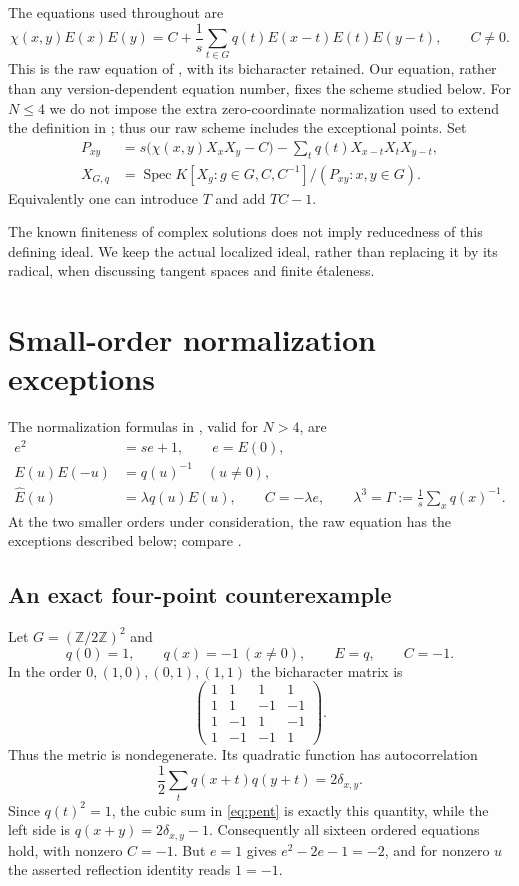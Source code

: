 \documentclass[11pt]{article}
\theoremstyle{remark}
\newcommand{\Z}{\mathbb Z}
\newcommand{\Spec}{\operatorname{Spec}}
\begin{document}
The equations used throughout are
\begin{equation}\label{eq:pent}
 \chi(x,y)E(x)E(y)
 =C+\frac1s\sum_{t\in G}q(t)E(x-t)E(t)E(y-t),\qquad C\ne0.
\end{equation}
This is the raw equation of \cite[Definition 4, Eq.~(29)]{RW}, with its
bicharacter retained. Our equation, rather than any version-dependent equation
number, fixes the scheme studied below. For $N\le4$ we do not impose the
extra zero-coordinate normalization used to extend the definition in
\cite[Remark~3]{RW2}; thus our raw scheme includes the exceptional points.
Set
\begin{align*}
 P_{xy}&=s\bigl(\chi(x,y)X_xX_y-C\bigr)
              -\sum_tq(t)X_{x-t}X_tX_{y-t},\\
 X_{G,q}&=\Spec K[X_g:g\in G,C,C^{-1}]/(P_{xy}:x,y\in G).
\end{align*}
Equivalently one can introduce $T$ and add $TC-1$.

The known finiteness of complex solutions \cite[Section~5]{RW2} does not
imply reducedness of this defining ideal. We keep the actual localized ideal,
rather than replacing it by its radical, when discussing tangent spaces and
finite \'{e}taleness.

\section{Small-order normalization exceptions}
The normalization formulas in \cite[Theorem~5]{RW2}, valid for $N>4$, are
\begin{align}
 e^2&=se+1,\qquad e=E(0),\label{eq:norm0}\\
 E(u)E(-u)&=q(u)^{-1}\quad(u\ne0),\label{eq:reflect}\\
 \widehat E(u)&=\lambda q(u)E(u),\qquad
 C=-\lambda e,\qquad
 \lambda^3=\Gamma:=\frac1s\sum_xq(x)^{-1}.\label{eq:fourier}
\end{align}
At the two smaller orders under consideration, the raw equation has the
exceptions described below; compare \cite[Remark~3]{RW2}.

\subsection{An exact four-point counterexample}
Let $G=(\Z/2\Z)^2$ and
\[
 q(0)=1,\qquad q(x)=-1\ (x\ne0),\qquad E=q,\qquad C=-1.
\]
In the order $0,(1,0),(0,1),(1,1)$ the bicharacter matrix is
\[
 \begin{pmatrix}
 1&1&1&1\\1&1&-1&-1\\1&-1&1&-1\\1&-1&-1&1
 \end{pmatrix}.
\]
Thus the metric is nondegenerate. Its quadratic function has autocorrelation
\[
 \frac12\sum_tq(x+t)q(y+t)=2\delta_{x,y}.
\]
Since $q(t)^2=1$, the cubic sum in \eqref{eq:pent} is exactly this
quantity, while the left side is $q(x+y)=2\delta_{x,y}-1$.
Consequently all sixteen ordered equations hold, with nonzero $C=-1$.
But $e=1$ gives $e^2-2e-1=-2$, and for nonzero $u$ the asserted reflection
identity reads $1=-1$.
\end{document}

